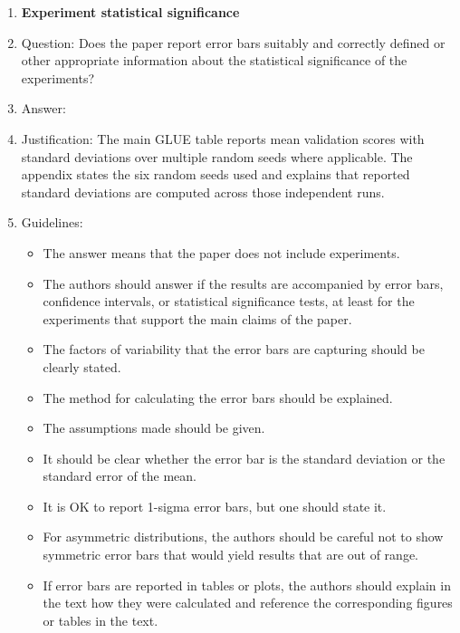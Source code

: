 \begin{enumerate}
\item {\bf Experiment statistical significance}
    \item[] Question: Does the paper report error bars suitably and correctly defined or other appropriate information about the statistical significance of the experiments?
    \item[] Answer: \answerYes{}
    \item[] Justification: The main GLUE table reports mean validation scores with standard deviations over multiple random seeds where applicable. The appendix states the six random seeds used and explains that reported standard deviations are computed across those independent runs.
    \item[] Guidelines:
    \begin{itemize}
        \item The answer \answerNA{} means that the paper does not include experiments.
        \item The authors should answer \answerYes{} if the results are accompanied by error bars, confidence intervals, or statistical significance tests, at least for the experiments that support the main claims of the paper.
        \item The factors of variability that the error bars are capturing should be clearly stated.
        \item The method for calculating the error bars should be explained.
        \item The assumptions made should be given.
        \item It should be clear whether the error bar is the standard deviation or the standard error of the mean.
        \item It is OK to report 1-sigma error bars, but one should state it.
        \item For asymmetric distributions, the authors should be careful not to show symmetric error bars that would yield results that are out of range.
        \item If error bars are reported in tables or plots, the authors should explain in the text how they were calculated and reference the corresponding figures or tables in the text.
    \end{itemize}


\end{enumerate}
